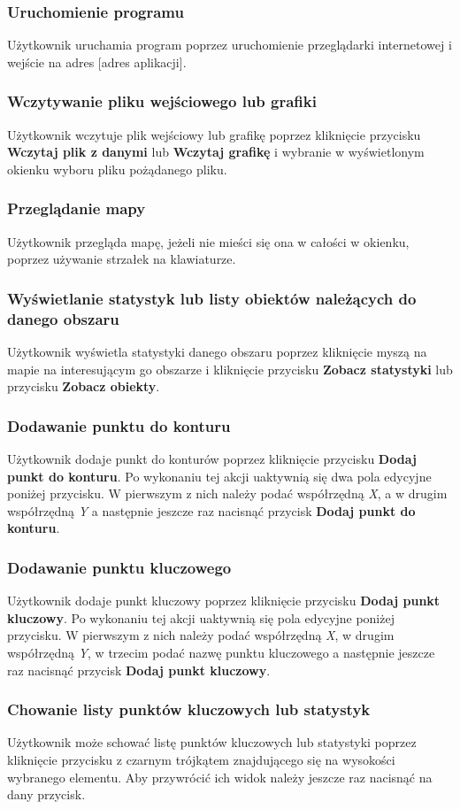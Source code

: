 \documentclass[a4paper, 10pt, titlepage]{article}
\begin{document}
\subsubsection{Uruchomienie programu}
Użytkownik uruchamia program poprzez uruchomienie przeglądarki internetowej i wejście na adres [adres aplikacji]. 
\subsubsection{Wczytywanie pliku wejściowego lub grafiki}
Użytkownik wczytuje plik wejściowy lub grafikę poprzez kliknięcie przycisku \textbf{Wczytaj plik z danymi} lub \textbf{Wczytaj grafikę} i wybranie w wyświetlonym okienku wyboru pliku pożądanego pliku.
\subsubsection{Przeglądanie mapy}
Użytkownik przegląda mapę, jeżeli nie mieści się ona w całości w okienku, poprzez używanie strzałek na klawiaturze. 
\subsubsection{Wyświetlanie statystyk lub listy obiektów należących do danego obszaru}
Użytkownik wyświetla statystyki danego obszaru poprzez kliknięcie myszą na mapie na interesującym go obszarze i kliknięcie przycisku \textbf{Zobacz statystyki} lub przycisku \textbf{Zobacz obiekty}.
\subsubsection{Dodawanie punktu do konturu}
Użytkownik dodaje punkt do konturów poprzez kliknięcie przycisku \textbf{Dodaj punkt do konturu}.
Po wykonaniu tej akcji uaktywnią się dwa pola edycyjne poniżej przycisku.
W pierwszym z nich należy podać współrzędną \textit{X}, a w drugim współrzędną \textit{Y} a następnie jeszcze raz nacisnąć przycisk \textbf{Dodaj punkt do konturu}.
\subsubsection{Dodawanie punktu kluczowego}
Użytkownik dodaje punkt kluczowy poprzez kliknięcie przycisku \textbf{Dodaj punkt kluczowy}.
Po wykonaniu tej akcji uaktywnią się pola edycyjne poniżej przycisku.
W pierwszym z nich należy podać współrzędną \textit{X}, w drugim współrzędną \textit{Y}, w trzecim podać nazwę punktu kluczowego a następnie jeszcze raz nacisnąć przycisk \textbf{Dodaj punkt kluczowy}.
\subsubsection{Chowanie listy punktów kluczowych lub statystyk}
Użytkownik może schować listę punktów kluczowych lub statystyki poprzez kliknięcie przycisku z czarnym trójkątem znajdującego się na wysokości wybranego elementu.
Aby przywrócić ich widok należy jeszcze raz nacisnąć na dany przycisk.
\end{document}
